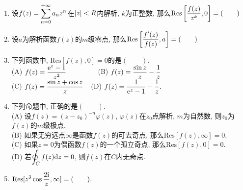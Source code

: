 \begin{yyEx}
	\begin{enumerate}
		\item 设$\begin{lgathered}
			f(z) = \sum_{n = 0}^{+\infty}a_nz^n
		\end{lgathered}$在$\lvert z\rvert<R$内解析, $k$为正整数, 那么$\begin{lgathered}
		\mathrm{Res}\left[ \frac{f(z)}{z^k},0 \right] = (\quad\quad)
		\end{lgathered}$
		\item 设$a$为解析函数$f(z)$的$m$级零点, 那么$\begin{lgathered}
			\mathrm{Res}\left[ \frac{f'(z)}{f(z)},a \right] = (\quad\quad)
		\end{lgathered}$
		\item 下列函数中, $\mathrm{Res}[f(z),0] = 0$的是$(\quad\quad)$.\\
			(A) $\begin{lgathered}
				f(z) = \frac{\mathrm{e}^z-1}{z^2}
			\end{lgathered}$~~~~~~~~~(B) $\begin{lgathered}
				f(z) = \frac{\sin z}{z}-\frac{1}{z}
			\end{lgathered}$\\(C) $\begin{lgathered}
				f(z) = \frac{\sin z+\cos z}{z}
			\end{lgathered}$~~(D) $\begin{lgathered}
				f(z) = \frac{1}{\mathrm{e}^z-1}-\frac{1}{z}.
			\end{lgathered}$
		\item 下列命题中, 正确的是$(\quad\quad)$.\\
			(A) 设$f(z) = (z-z_0)^{-n}\varphi(z)$, $\varphi(z)$在$z_0$点解析, $m$为自然数, 则$z_0$为$f(z)$的$m$级极点.\\
			(B) 如果无穷远点$\infty$是函数$f(z)$的可去奇点, 那么$\mathrm{Res}[f(z),\infty] = 0$.\\
			(C) 如果$z = 0$为偶函数$f(z)$的一个孤立奇点, 那么$\mathrm{Res}[f(z),0] = 0$.\\
			(D) 若$\begin{lgathered}
				\oint_Cf(z)\mathrm{d}z = 0
			\end{lgathered}$, 则$f(z)$在$C$内无奇点.
		\item $\begin{lgathered}
		\mathrm{Res}[z^3\cos\frac{2\mathrm{i}}{z},\infty] = (\quad\quad).
		\end{lgathered}$

\end{enumerate}
\end{yyEx}
